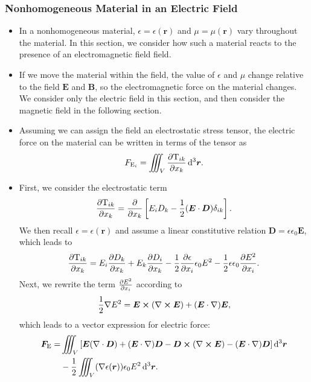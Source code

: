 \documentclass[11pt, a4paper]{article}
\newcommand{\diff}{\mathop{}\!\mathrm{d}} %
\newcommand{\dr}{\diff^{3} \r}  %
\renewcommand{\vec}[1]{\bm{#1}} %
\renewcommand{\r}{\vec{r}}
\newcommand{\E}{\vec{E}} %
\newcommand{\D}{\vec{D}}  %
\newcommand{\B}{\vec{B}} %
\newcommand{\TT}{\mathrm{T}}  %
\newcommand{\e}{\epsilon}
\newcommand{\ee}{\epsilon_{0}}  %
\renewcommand{\div}{\nabla \cdot}
\renewcommand{\curl}{\nabla \cross}
\renewcommand{\grad}{\nabla}
\begin{document}
\subsubsection{Nonhomogeneous Material in an Electric Field}
\begin{itemize}
	\item In a nonhomogeneous material, $ \e = \e(\r) $ and $ \mu = \mu(\r) $ vary throughout the material. In this section, we consider how such a material reacts to the presence of an electromagnetic field field.
	
	\item If we move the material within the field, the value of $ \e $ and $ \mu $ change relative to the field $ \E $ and $ \B $, so the electromagnetic force on the material changes. We consider only the electric field in this section, and then consider the magnetic field in the following section.

    \item Assuming we can assign the field an electrostatic stress tensor, the electric force on the material can be written in terms of the tensor as
	\begin{equation*}
		F_{\text{E}_{i}} = \iiint_{V}\pdv{\TT_{ik}}{x_{k}} \dr.
	\end{equation*}
	
	\item First, we consider the electrostatic term
	\begin{equation*}
		\pdv{\TT_{ik}}{x_{k}} = \pdv{x_{k}} \left[ E_{i}D_{k} - \frac{1}{2}(\E \cdot \D) \delta_{ik}\right].
	\end{equation*}
    We then recall $ \e = \e(\r) $ and assume a linear constitutive relation $ \D = \e \ee \E $, which leads to 
	\begin{equation*}
		\pdv{\TT_{ik}}{x_{k}} = E_{i}\pdv{D_{k}}{x_{k}} + E_{k}\pdv{D_{i}}{x_{k}} - \frac{1}{2}\pdv{\e}{x_{i}}\ee E^{2} - \frac{1}{2}\e \ee \pdv{E^{2}}{x_{i}}.
	\end{equation*}
	Next, we rewrite the term $ \pdv{E^{2}}{x_{i}} $ according to
	\begin{equation*}
		\frac{1}{2}\grad E^{2} = \E \cross (\curl \E) + (\E \cdot \grad)\E,
	\end{equation*}
	which leads to a vector expression for electric force:
	\begin{align*}
		\vec{F}_{\text{E}} = &\iiint_{V}\left[\E (\div \D) + (\E \cdot \grad )\D - \D \cross (\curl \E) - (\E \cdot \grad )\D\right] \dr\\
		& - \frac{1}{2}\iiint_{V}(\grad \e(\r))\ee E^{2}\dr.
	\end{align*}
	

\end{itemize}
\end{document}
